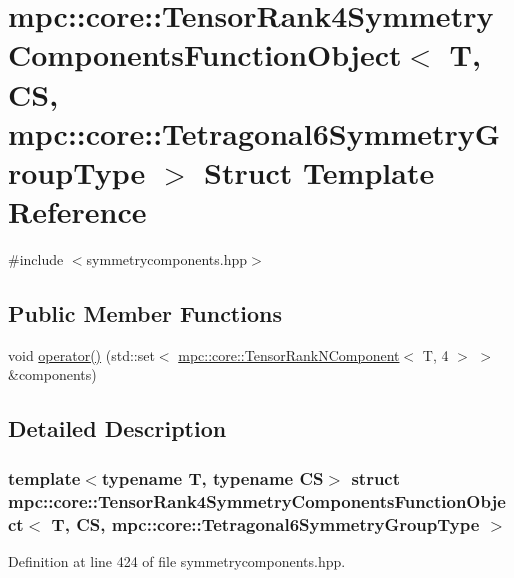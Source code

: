 \hypertarget{structmpc_1_1core_1_1_tensor_rank4_symmetry_components_function_object_3_01_t_00_01_c_s_00_01mpcb35265619212e0eab46a619a1df412a3}{}\section{mpc\+:\+:core\+:\+:Tensor\+Rank4\+Symmetry\+Components\+Function\+Object$<$ T, CS, mpc\+:\+:core\+:\+:Tetragonal6\+Symmetry\+Group\+Type $>$ Struct Template Reference}
\label{structmpc_1_1core_1_1_tensor_rank4_symmetry_components_function_object_3_01_t_00_01_c_s_00_01mpcb35265619212e0eab46a619a1df412a3}


{\ttfamily \#include $<$symmetrycomponents.\+hpp$>$}

\subsection*{Public Member Functions}
\begin{DoxyCompactItemize}
\item 
void \mbox{\hyperlink{structmpc_1_1core_1_1_tensor_rank4_symmetry_components_function_object_3_01_t_00_01_c_s_00_01mpcb35265619212e0eab46a619a1df412a3_a2325e8e7b5be33a8cb7c27698bd179d5}{operator()}} (std\+::set$<$ \mbox{\hyperlink{classmpc_1_1core_1_1_tensor_rank_n_component}{mpc\+::core\+::\+Tensor\+Rank\+N\+Component}}$<$ T, 4 $>$ $>$ \&components)
\end{DoxyCompactItemize}


\subsection{Detailed Description}
\subsubsection*{template$<$typename T, typename CS$>$\newline
struct mpc\+::core\+::\+Tensor\+Rank4\+Symmetry\+Components\+Function\+Object$<$ T, C\+S, mpc\+::core\+::\+Tetragonal6\+Symmetry\+Group\+Type $>$}



Definition at line 424 of file symmetrycomponents.\+hpp.



